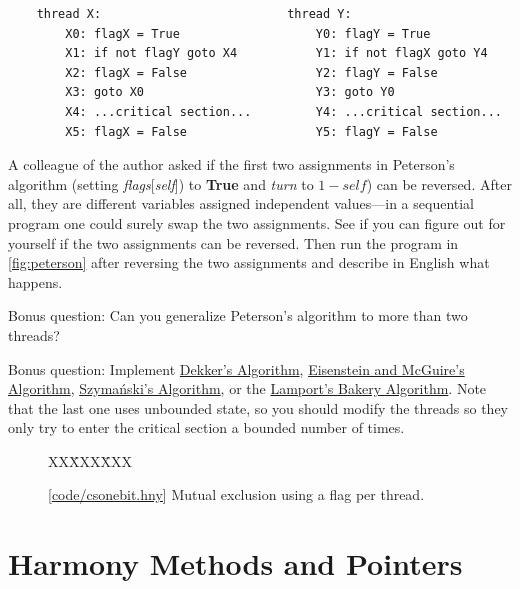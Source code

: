 \documentclass{report}
\newcommand{\harmonysource}[1]{
\begin{tabbing}
XX\=XXX\=XXX\kill
    
\end{tabbing}
}
\newcommand{\harmonylink}[1]{%
[\href{https://harmony.cs.cornell.edu/#1}{\underline{#1}}]%
}
\newenvironment{code}{
\tcolorbox
}{
\endtcolorbox
}
\begin{document}
\begin{problems}
\begin{code}
\begin{verbatim}
    thread X:                          thread Y:
        X0: flagX = True                   Y0: flagY = True
        X1: if not flagY goto X4           Y1: if not flagX goto Y4
        X2: flagX = False                  Y2: flagY = False
        X3: goto X0                        Y3: goto Y0
        X4: ...critical section...         Y4: ...critical section...
        X5: flagX = False                  Y5: flagY = False
\end{verbatim}
\end{code}
\item \label{ex:reorder}
A colleague of the author asked if the first two assignments in
Peterson's algorithm (setting \textit{flags}[\textit{self}])
to \textbf{True} and \textit{turn} to $1 - \mathit{self}$) can be reversed.
After all, they are different variables assigned independent values---in a
sequential program one could surely swap the two assignments.
See if you can figure out for yourself if the two assignments can be
reversed.  Then run the program in \autoref{fig:peterson} after reversing
the two assignments and describe in English what happens.
\item Bonus question:
Can you generalize Peterson's algorithm to more than two threads?
\item Bonus question:
Implement
\href{https://en.wikipedia.org/wiki/Dekker%27s_algorithm}{Dekker's Algorithm},
\href{https://en.wikipedia.org/wiki/Eisenberg_%26_McGuire_algorithm}{Eisenstein and McGuire's Algorithm},
\href{https://en.wikipedia.org/wiki/Szymanski%27s_algorithm}{Szymański's Algorithm}, or the
\href{https://en.wikipedia.org/wiki/Lamport%27s_bakery_algorithm}{Lamport's Bakery Algorithm}.
Note that the last one uses unbounded state, so you should modify the threads so they
only try to enter the critical section a bounded number of times.
\end{problems}

\begin{figure}
\begin{code}
\harmonysource{csonebit}
\end{code}
\caption{\harmonylink{code/csonebit.hny} Mutual exclusion using a flag per thread.}
\label{fig:csonebit}
\end{figure}

\chapter{Harmony Methods and Pointers}
\label{ch:method}
%
\end{document}
